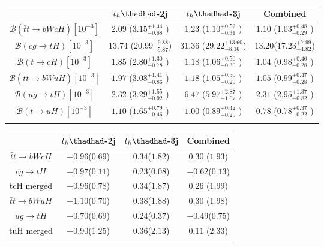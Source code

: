 \centering
\begin{tabular}{cccc} \toprule\toprule
 & $t_h\thadhad$-2j & $t_h\thadhad$-3j & Combined\\\midrule

$\mathcal{B}(\bar{t}t\to bWcH)[10^{-3}]$     & $2.09$  ($3.15^{+1.44}_{-0.88}$ ) & $1.23$  ($1.10^{+0.52}_{-0.31}$  )  & $1.10$ ($1.03^{+0.48}_{-0.29}$ )\\
$\mathcal{B}(cg\to tH)[10^{-3}]$             & $13.74$ ($20.99^{+9.88}_{-5.87}$) & $31.36$ ($29.22^{+13.60}_{-8.16}$)  & $13.20$($17.23^{+7.99}_{-4.82}$)\\
$\mathcal{B}(t\to cH)[10^{-3}]$             & $1.85$  ($2.80^{+1.30}_{-0.78}$ ) & $1.18$  ($1.06^{+0.50}_{-0.30}$  )  & $1.04$ ($0.98^{+0.46}_{-0.28}$ )\\
$\mathcal{B}(\bar{t}t\to bWuH)[10^{-3}]$     & $1.97$  ($3.08^{+1.41}_{-0.86}$ ) & $1.18$  ($1.05^{+0.50}_{-0.29}$  )  & $1.05$ ($0.99^{+0.47}_{-0.28}$ )\\
$\mathcal{B}(ug\to tH)[10^{-3}]$             & $2.32$  ($3.29^{+1.55}_{-0.92}$ ) & $6.47$  ($5.97^{+2.87}_{-1.67}$  )  & $2.31$ ($2.95^{+1.37}_{-0.82}$ )\\
$\mathcal{B}(t\to uH)[10^{-3}]$    & $1.10$  ($1.65^{+0.79}_{-0.46}$ ) & $1.00$  ($0.89^{+0.42}_{-0.25}$  )  & $0.78$ ($0.78^{+0.37}_{-0.22}$ )\\
\bottomrule\bottomrule\\
\end{tabular}




\centering
\begin{tabular}{cccc} \toprule\toprule
 & $t_h\thadhad$-2j & $t_h\thadhad$-3j & Combined\\\midrule
$\bar{t}t\to bWcH$ & $-0.96$($0.69$) & $0.34$($1.82$)& $0.30$ ($1.93$)\\
$cg\to tH$         & $-0.97$($0.11$) & $0.23$($0.08$)& $-0.62$($0.13$)\\
tcH merged         & $-0.96$($0.78$) & $0.34$($1.87$)& $0.26$ ($1.99$)\\
$\bar{t}t\to bWuH$ & $-1.10$($0.70$) & $0.38$($1.88$)& $0.30$ ($1.98$)\\
$ug\to tH$         & $-0.70$($0.69$) & $0.24$($0.37$)& $-0.49$($0.75$)\\
tuH merged         & $-0.90$($1.25$) & $0.36$($2.13$)& $0.11$ ($2.33$)\\
\bottomrule\bottomrule\\
\end{tabular}



          


